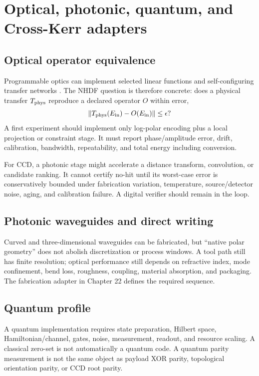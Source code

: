 \documentclass[11pt,a4paper,openany]{book}
\begin{document}
\chapter{Optical, photonic, quantum, and Cross-Kerr adapters}
\section{Optical operator equivalence}
Programmable optics can implement selected linear functions and self-configuring transfer networks \citep{miller2013optical}. The NHDF question is therefore concrete: does a physical transfer $T_{\rm phys}$ reproduce a declared operator $O$ within error,
\begin{equation}
\|T_{\rm phys}(E_{\rm in})-O(E_{\rm in})\|\le\epsilon?
\end{equation}
A first experiment should implement only log-polar encoding plus a local projection or constraint stage. It must report phase/amplitude error, drift, calibration, bandwidth, repeatability, and total energy including conversion.

For CCD, a photonic stage might accelerate a distance transform, convolution, or candidate ranking. It cannot certify no-hit until its worst-case error is conservatively bounded under fabrication variation, temperature, source/detector noise, aging, and calibration failure. A digital verifier should remain in the loop.

\section{Photonic waveguides and direct writing}
Curved and three-dimensional waveguides can be fabricated, but ``native polar geometry'' does not abolish discretization or process windows. A tool path still has finite resolution; optical performance still depends on refractive index, mode confinement, bend loss, roughness, coupling, material absorption, and packaging. The fabrication adapter in Chapter 22 defines the required sequence.

\section{Quantum profile}
A quantum implementation requires state preparation, Hilbert space, Hamiltonian/channel, gates, noise, measurement, readout, and resource scaling. A classical zero-set is not automatically a quantum code. A quantum parity measurement is not the same object as payload XOR parity, topological orientation parity, or CCD root parity.
\end{document}
